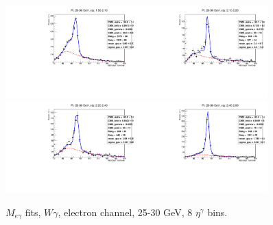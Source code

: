 \begin{figure}[htb]
\begin{center}
   \includegraphics[width=0.45\textwidth]{../figs/figs_v11/ELECTRON_WGamma/EtoGammaFits/sa_hZmass_h_Data_EtoGamma_Enr_ENDCAP_pt25to30_ieta0.pdf}\includegraphics[width=0.45\textwidth]{../figs/figs_v11/ELECTRON_WGamma/EtoGammaFits/sa_hZmass_h_Data_EtoGamma_Enr_ENDCAP_pt25to30_ieta1.pdf}\\
   \includegraphics[width=0.45\textwidth]{../figs/figs_v11/ELECTRON_WGamma/EtoGammaFits/sa_hZmass_h_Data_EtoGamma_Enr_ENDCAP_pt25to30_ieta2.pdf}\includegraphics[width=0.45\textwidth]{../figs/figs_v11/ELECTRON_WGamma/EtoGammaFits/sa_hZmass_h_Data_EtoGamma_Enr_ENDCAP_pt25to30_ieta3.pdf}\\
  \label{fig:etogFits_25to30}
  \caption{$M_{e\gamma}$ fits, $W\gamma$, electron channel, 25-30 GeV, 8 $\eta^{\gamma}$ bins.}
  \end{center}
\end{figure}

